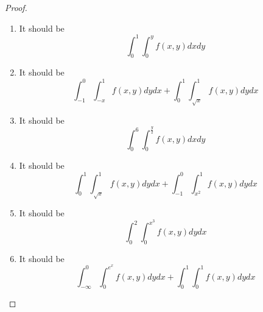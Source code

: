 \documentclass[openany]{book}
\begin{document}
\begin{proof}
    \begin{enumerate}
        \item It should be 
        \begin{equation*}
            \int_0^1\int_0^yf(x,y)dxdy
        \end{equation*}
        \item It should be 
        \begin{equation*}
            \int_{-1}^0\int_{-x}^{1}f(x,y)dydx+\int_{0}^1\int_{\sqrt{x}}^1f(x,y)dydx
        \end{equation*}
        \item It should be 
        \begin{equation*}
            \int_0^6\int_0^{\frac{y}{2}}f(x,y)dxdy
        \end{equation*}
        \item It should be \begin{equation*}
            \int_0^1\int_{\sqrt{x}}^1f(x,y)dydx+\int_{-1}^0\int_{x^2}^1f(x,y)dydx
        \end{equation*}
        \item It should be 
        \begin{equation*}
            \int_0^2\int_0^{x^3}f(x,y)dydx
        \end{equation*}
        \item It should be 
        \begin{equation*}
            \int_{-\infty}^0\int_0^{e^x}f(x,y)dydx+\int_0^1\int_0^1f(x,y)dydx
        \end{equation*}
    \end{enumerate}
\end{proof}
\end{document}
